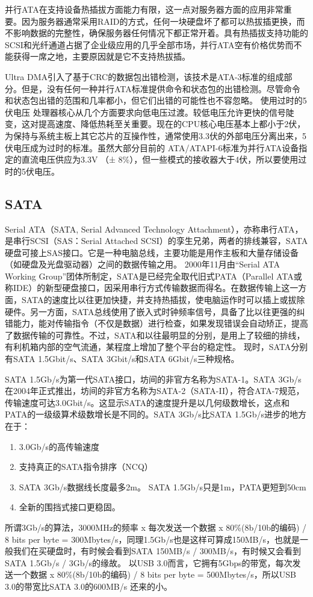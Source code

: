 并行ATA在支持设备热插拔方面能力有限，这一点对服务器方面的应用非常重要。因为服务器通常采用RAID的方式，任何一块硬盘坏了都可以热拔插更换，而不影响数据的完整性，确保服务器任何情况下都正常开着。具有热插拔支持功能的SCSI和光纤通道占据了企业级应用的几乎全部市场，并行ATA空有价格优势而不能获得一席之地，主要原因就是它不支持热拔插。 

Ultra DMA引入了基于CRC的数据包出错检测，该技术是ATA-3标准的组成部分。但是，没有任何一种并行ATA标准提供命令和状态包的出错检测。尽管命令和状态包出错的范围和几率都小，但它们出错的可能性也不容忽略。 
使用过时的5伏电压 
处理器核心从几个方面要求向低电压过渡。较低电压允许更快的信号陡变，这对提高速度、降低热耗至关重要。现在的CPU核心电压基本上都小于2伏，为保持与系统主板上其它芯片的互操作性，通常使用3.3伏的外部电压分离出来，5伏电压成为过时的标准。虽然大部分目前的 ATA/ATAPI-6标准为并行ATA设备指定的直流电压供应为3.3V （± 8\%），但一些模式的接收器大于4伏，所以要使用过时的5伏电压。 

\subsection{SATA}
Serial ATA（SATA, Serial Advanced Technology Attachment），亦称串行ATA，是串行SCSI（SAS：Serial Attached SCSI）的孪生兄弟，两者的排线兼容，SATA硬盘可接上SAS接口。它是一种电脑总线，主要功能是用作主板和大量存储设备（如硬盘及光盘驱动器）之间的数据传输之用。
2000年11月由“Serial ATA Working Group”团体所制定，SATA是已经完全取代旧式PATA（Parallel ATA或称IDE）的新型硬盘接口，因采用串行方式传输数据而得名。在数据传输上这一方面，SATA的速度比以往更加快捷，并支持热插拔，使电脑运作时可以插上或拔除硬件。另一方面，SATA总线使用了嵌入式时钟频率信号，具备了比以往更强的纠错能力，能对传输指令（不仅是数据）进行检查，如果发现错误会自动矫正，提高了数据传输的可靠性。不过，SATA和以往最明显的分别，是用上了较细的排线，有利机箱内部的空气流通，某程度上增加了整个平台的稳定性。
现时，SATA分别有SATA 1.5Gbit/s、SATA 3Gbit/s和SATA 6Gbit/s三种规格。

SATA 1.5Gb/s为第一代SATA接口，坊间的非官方名称为SATA-1。SATA 3Gb/s在2004年正式推出，坊间的非官方名称为SATA-2（SATA-II），符合ATA-7规范，传输速度可达3.0Gbit/s。这显示SATA的速度提升是以几何级数增长，这点和PATA的一级级算术级数增长是不同的。SATA 3Gb/s比SATA 1.5Gb/s进步的地方在于：
\begin{enumerate}
    \item 
3.0Gb/s的高传输速度
    \item 
支持真正的SATA指令排序（NCQ）
    \item 
SATA 3Gb/s数据线长度最多2m。 SATA 1.5Gb/s只是1m，PATA更短到50cm
    \item 
全新的围挡式接口更稳固。
\end{enumerate}
所谓3Gb/s的算法，3000MHz的频率 x 每次发送一个数据 x 80\%(8b/10b的编码) / 8 bits per byte = 300Mbytes/s，同理1.5Gb/s也是这样可算成150MB/s，也就是一般我们在买硬盘时，有时候会看到SATA 150MB/s / 300MB/s，有时候又会看到SATA 1.5Gb/s / 3Gb/s的缘故。
以USB 3.0而言，它拥有5Gbps的带宽，每次发送一个数据 x 80\%(8b/10b的编码) / 8 bits per byte = 500Mbytes/s，所以USB 3.0的带宽比SATA 3.0的600MB/s 还来的小。

